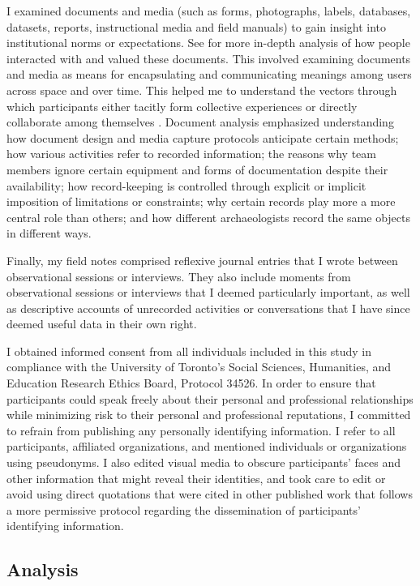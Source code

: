 \documentclass{article}
\begin{document}
I examined documents and media (such as forms, photographs, labels,
databases, datasets, reports, instructional media and field manuals) to
gain insight into institutional norms or expectations. See
\textcites{batist2024a}{batist-alienation} for more in-depth
analysis of how people interacted with and valued these documents. This
involved examining documents and media as means for encapsulating and
communicating meanings among users across space and over time. This
helped me to understand the vectors through which participants either
tacitly form collective experiences or directly collaborate among
themselves \parencites{huvila2011}{huvila2016}{yarrow2008}. Document
analysis emphasized understanding how document design and media capture
protocols anticipate certain methods; how various activities refer to
recorded information; the reasons why team members ignore certain
equipment and forms of documentation despite their availability; how
record-keeping is controlled through explicit or implicit imposition of
limitations or constraints; why certain records play more a more central
role than others; and how different archaeologists record the same
objects in different ways.

Finally, my field notes comprised reflexive journal entries that I wrote
between observational sessions or interviews. They also include moments
from observational sessions or interviews that I deemed particularly
important, as well as descriptive accounts of unrecorded activities or
conversations that I have since deemed useful data in their own right.

I obtained informed consent from all individuals included in this study
in compliance with the University of Toronto's Social Sciences,
Humanities, and Education Research Ethics Board, Protocol 34526. In
order to ensure that participants could speak freely about their
personal and professional relationships while minimizing risk to their
personal and professional reputations, I committed to refrain from
publishing any personally identifying information. I refer to all
participants, affiliated organizations, and mentioned individuals or
organizations using pseudonyms. I also edited visual media to obscure
participants' faces and other information that might reveal their
identities, and took care to edit or avoid using direct quotations that
were cited in other published work that follows a more permissive
protocol regarding the dissemination of participants' identifying
information.

\subsection{Analysis}
\end{document}
